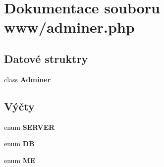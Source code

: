 \section{Dokumentace souboru www/adminer.php}
\label{da/d8e/adminer_8php}
\subsection*{Datové struktry}
\begin{DoxyCompactItemize}
\item 
class {\bf Adminer}
\end{DoxyCompactItemize}
\subsection*{Výčty}
\begin{DoxyCompactItemize}
\item 
enum {\bf SERVER} 
\item 
enum {\bf DB} 
\item 
enum {\bf ME} 
\end{DoxyCompactItemize}

